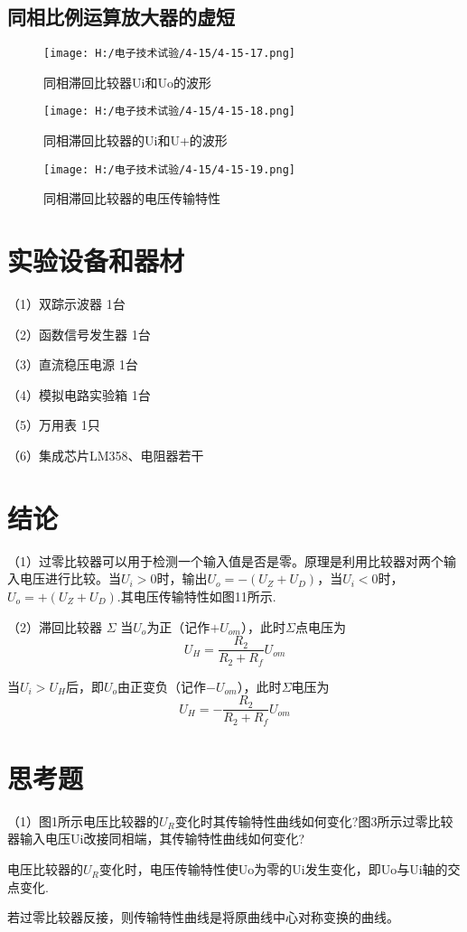 \documentclass{article}
\begin{document}
	\subsection {同相比例运算放大器的虚短}
    \begin{figure}[h]
      \begin{minipage}[t]{0.5\linewidth} %
		\centering
		\texttt{[image: H:/电子技术试验/4-15/4-15-17.png]}
		\caption{同相滞回比较器Ui和Uo的波形} \label{fig:aa}
	\end{minipage}
  \begin{minipage}[t]{0.5\linewidth} %
		\centering
		\texttt{[image: H:/电子技术试验/4-15/4-15-18.png]}
		\caption{同相滞回比较器的Ui和U+的波形} \label{fig:aa}
	\end{minipage}
  \end{figure}
    \begin{figure}[h]
		\centering
		\texttt{[image: H:/电子技术试验/4-15/4-15-19.png]}
		\caption{同相滞回比较器的电压传输特性} \label{fig:aa}
	\end{figure}
	\par

	\section{ 实验设备和器材}
	（1）双踪示波器             \qquad \qquad \qquad \qquad \qquad  \qquad           1台\par
	（2）函数信号发生器          \qquad  \qquad \qquad \qquad       \qquad           1台\par
	（3）直流稳压电源             \qquad \quad \qquad \qquad \qquad \qquad           1台\par
	（4）模拟电路实验箱            \qquad  \qquad \qquad \qquad\qquad                1台\par
	（5）万用表                   \qquad  \qquad \qquad \qquad \qquad \qquad \qquad  1只\par
	（6）集成芯片LM358、电阻器\qquad\quad                                        若干

\section{结论}
（1）过零比较器可以用于检测一个输入值是否是零。原理是利用比较器对两个输入电压进行比较。当$U_i>$0时，输出$U_o=-(U_Z+U_D)$，当$U_i<0$时，$U_o=+(U_Z+U_D)$.其电压传输特性如图11所示.\par
（2）滞回比较器 $\Sigma$ 当$U_o$为正（记作$+U_{om}$），此时$\Sigma$点电压为\[U_H=\frac{R_2}{R_2+R_f}U_{om}\]  \par
当$U_i>U_H$后，即$U_o$由正变负（记作$-U_{om}$），此时$\Sigma$电压为\[U_H=-\frac{R_2}{R_2+R_f}U_{om}\]  \par

\section{思考题}
（1）图1所示电压比较器的$U_R$变化时其传输特性曲线如何变化?图3所示过零比较器输入电压Ui改接同相端，其传输特性曲线如何变化?\par
电压比较器的$U_R$变化时，电压传输特性使Uo为零的Ui发生变化，即Uo与Ui轴的交点变化.\par 
若过零比较器反接，则传输特性曲线是将原曲线中心对称变换的曲线。
\end{document}
